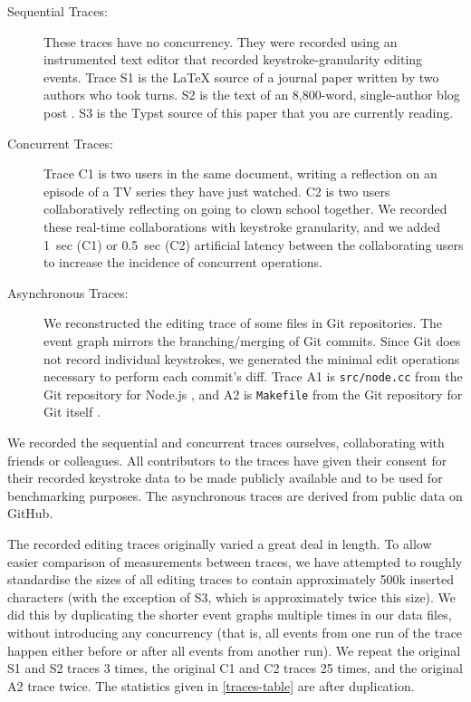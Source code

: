 \documentclass[sigplan,10pt]{acmart}
\begin{document}
\begin{description}
    \item[Sequential Traces:] These traces have no concurrency. They were recorded using an instrumented text editor that recorded keystroke-granularity editing events. Trace S1 is the LaTeX source of a journal paper \cite{Kleppmann2017,automerge-perf} written by two authors who took turns. S2 is the text of an 8,800-word, single-author blog post \cite{crdts-go-brrr}. S3 is the Typst source of this paper that you are currently reading.
    \item[Concurrent Traces:] Trace C1 is two users in the same document, writing a reflection on an episode of a TV series they have just watched. C2 is two users collaboratively reflecting on going to clown school together. We recorded these real-time collaborations with keystroke granularity, and we added 1~sec (C1) or 0.5~sec (C2) artificial latency between the collaborating users to increase the incidence of concurrent operations.
    \item[Asynchronous Traces:] We reconstructed the editing trace of some files in Git repositories. The event graph mirrors the branching/merging of Git commits. Since Git does not record individual keystrokes, we generated the minimal edit operations necessary to perform each commit's diff. Trace A1 is \texttt{src/node.cc} from the Git repository for Node.js \cite{node-src-nodecc}, and A2 is \texttt{Makefile} from the Git repository for Git itself \cite{git-makefile}.
\end{description}

We recorded the sequential and concurrent traces ourselves, collaborating with friends or colleagues.
All contributors to the traces have given their consent for their recorded keystroke data to be made publicly available and to be used for benchmarking purposes.
The asynchronous traces are derived from public data on GitHub.

The recorded editing traces originally varied a great deal in length.
To allow easier comparison of measurements between traces, we have attempted to roughly standardise the sizes of all editing traces to contain approximately 500k inserted characters (with the exception of S3, which is approximately twice this size).
We did this by duplicating the shorter event graphs multiple times in our data files, without introducing any concurrency (that is, all events from one run of the trace happen either before or after all events from another run).
We repeat the original S1 and S2 traces 3 times, the original C1 and C2 traces 25 times, and the original A2 trace twice.
The statistics given in \autoref{traces-table} are after duplication.
\end{document}

